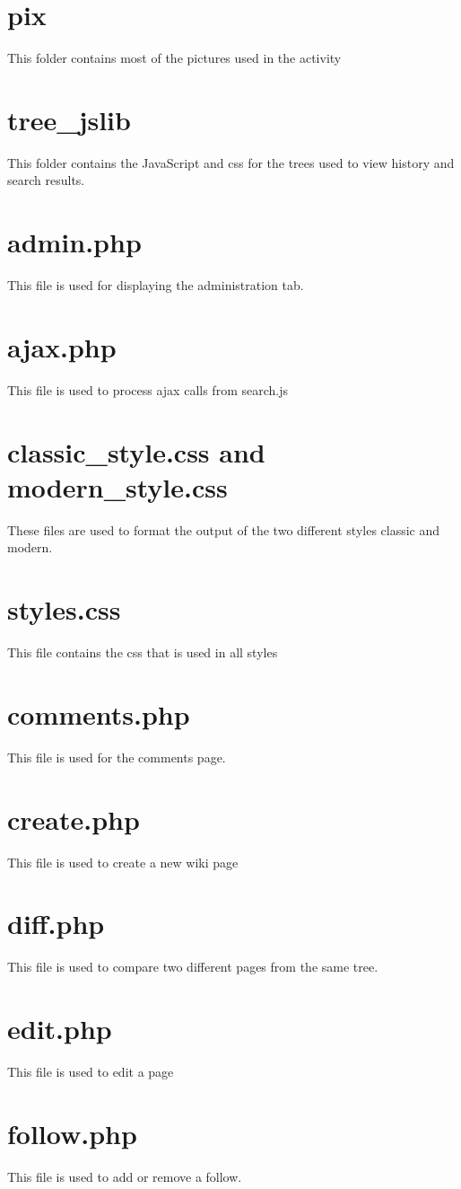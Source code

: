 \documentclass[letterpaper,twoside,12pt]{report}
\begin{document}
	\section{pix}
	This folder contains most of the pictures used in the activity
	\section{tree\_jslib}
	This folder contains the JavaScript and css for the trees used to view history and search results.
	\section{admin.php}
	This file is used for displaying the administration tab.
	\section{ajax.php}
	This file is used to process ajax calls from search.js
	\section{classic\_style.css and modern\_style.css}
	These files are used to format the output of the two different styles classic and modern.
	\section{styles.css}
	This file contains the css that is used in all styles
	\section{comments.php}
	This file is used for the comments page.
	\section{create.php}
	This file is used to create a new wiki page
	\section{diff.php}
	This file is  used to compare two different pages from the same tree.
	\section{edit.php}
	This file is used to edit a page
	\section{follow.php}
	This file is used to add or remove a follow.
\end{document}
